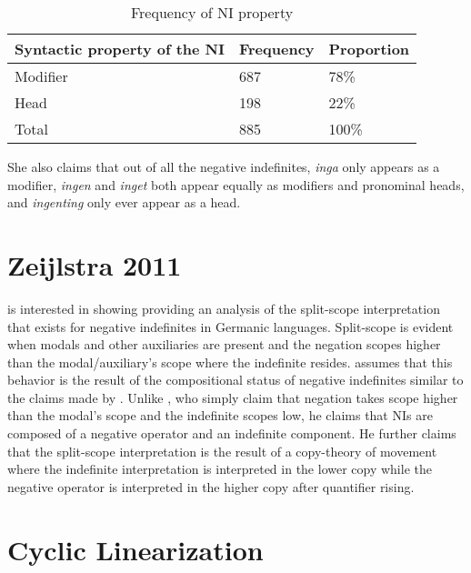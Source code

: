 \documentclass[12pt, letterpaper]{article}
\begin{document}
	\begin{table}[h!]
	\centering
	\caption{Frequency of NI property}
	\begin{tabular}{lll}
	Syntactic property of the NI & Frequency & Proportion\\
	\hline
	Modifier & 687 & 78\% \\
	Head & 198 & 22\% \\
	\hline
	Total & 885 & 100\%  \\
	\hline 
	\end{tabular}
	\end{table}

\ex She also claims that out of all the negative indefinites, \textit{inga} only appears as a modifier, \textit{ingen} and \textit{inget} both appear equally as modifiers and pronominal heads, and \textit{ingenting} only ever appear as a head. 
\z 

\section{Zeijlstra 2011} \label{sec:ZEIJLSTRA}

\ea \cite{zeijlstraSyntacticallyComplexStatus2011} is interested in showing providing an analysis of the split-scope interpretation that exists for negative indefinites in Germanic languages. 
\ex Split-scope is evident when modals and other auxiliaries are present and the negation scopes higher than the modal/auxiliary's scope where the indefinite resides. 
\ex \citeauthor{zeijlstraSyntacticallyComplexStatus2011} assumes that this behavior is the result of the compositional status of negative indefinites similar to the claims made by \citet{iatridouNegativeDPsAMovement2011}. Unlike \citeauthor{iatridouNegativeDPsAMovement2011}, who simply claim that negation takes scope higher than the modal's scope and the indefinite scopes low, he claims that NIs are composed of a negative operator and an indefinite component.
\ex He further claims that the split-scope interpretation is the result of a copy-theory of movement where the indefinite interpretation is interpreted in the lower copy while the negative operator is interpreted in the higher copy after quantifier rising. 
\z 


\section{Cyclic Linearization} \label{sec:CL}
\end{document}
